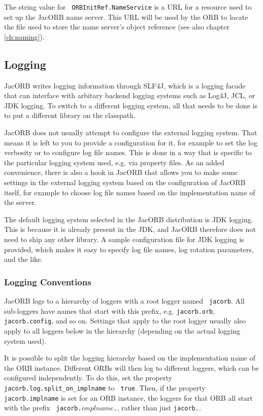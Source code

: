 The  string value  for  {\tt
ORBInitRef.NameService} is  a URL  for a resource  used to set  up the
JacORB name  server. This URL  will be used  by the ORB to  locate the
file  used to  store  the  name server's  object  reference (see  also
chapter \ref{ch:naming}).

\subsection{Logging}

JacORB writes logging information through SLF4J, which is a logging
facade that can interface with arbitary backend logging systems such
as Log4J, JCL, or JDK logging.  To switch to a different logging
system, all that needs to be done is to put a different library on the
classpath.

JacORB does not usually attempt to configure the external logging
system.  That means it is left to you to provide a configuration for
it, for example to set the log verbosity or to configure log file
names.  This is done in a way that is specific to the particular
logging system used, e.g. via property files.  As an added
convenience, there is also a hook in JacORB that allows you to make
some settings in the external logging system based on the
configuration of JacORB itself, for example to choose log file names
based on the implementation name of the server.

The default logging system selected in the JacORB distribution is JDK
logging.  This is because it is already present in the JDK, and JacORB
therefore does not need to ship any other library.  A sample
configuration file for JDK logging is provided, which makes it easy to
specify log file names, log rotation parameters, and the like.

\subsubsection{Logging Conventions}

JacORB logs to a hierarchy of loggers with a root logger named {\tt
  jacorb}.  All sub-loggers have names that start with this prefix,
e.g. {\tt jacorb.orb}, {\tt jacorb.config}, and so on.  Settings that
apply to the root logger usually also apply to all loggers below in
the hierarchy (depending on the actual logging system used).

It is possible to split the logging hierarchy based on the
implementation name of the ORB instance.  Different ORBs will then log
to different loggers, which can be configured independently.  To do
this, set the property {\tt jacorb.log.split\_on\_implname} to {\tt
  true}.  Then, if the property {\tt jacorb.implname} is set for an
ORB instance, the loggers for that ORB all start with the prefix {\tt
  jacorb.$implname$.}, rather than just {\tt jacorb.}.

